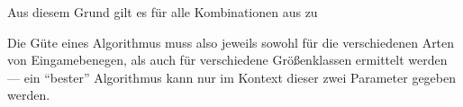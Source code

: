Aus diesem Grund gilt es für alle Kombinationen aus zu

Die Güte eines Algorithmus muss also jeweils sowohl für die verschiedenen Arten von Eingamebenegen, als auch für verschiedene Größenklassen ermittelt werden --- ein \enquote{bester} Algorithmus kann nur im Kontext dieser zwei Parameter gegeben werden.






